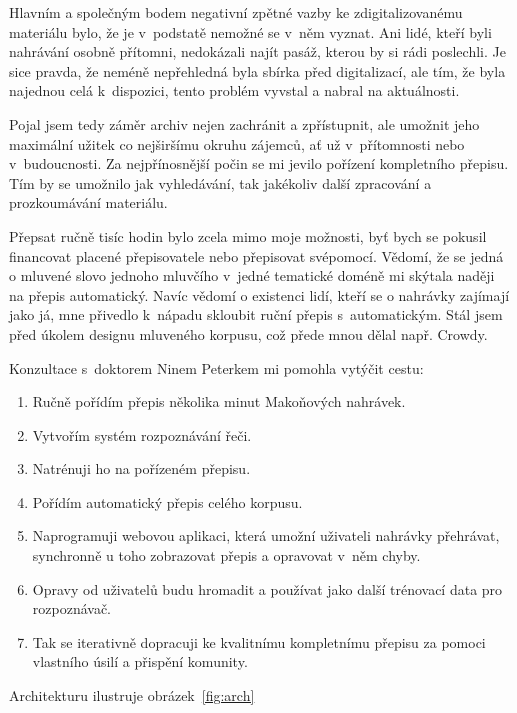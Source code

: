 Hlavním a společným bodem negativní zpětné vazby ke zdigitalizovanému materiálu
bylo, že je v~podstatě nemožné se v~něm vyznat. Ani lidé, kteří byli nahrávání
osobně přítomni, nedokázali najít pasáž, kterou by si rádi poslechli. Je
sice pravda, že neméně nepřehledná byla sbírka před digitalizací, ale tím, že
byla najednou celá k~dispozici, tento problém vyvstal a nabral na aktuálnosti.

Pojal jsem tedy záměr archiv nejen zachránit a zpřístupnit, ale umožnit jeho
maximální užitek co nejširšímu okruhu zájemců, ať už v~přítomnosti nebo
v~budoucnosti.
Za nejpřínosnější počin se mi jevilo pořízení kompletního
přepisu. Tím by se umožnilo jak vyhledávání, tak jakékoliv další zpracování a
prozkoumávání materiálu.

Přepsat ručně tisíc hodin bylo zcela mimo moje možnosti, byť bych se pokusil
financovat placené přepisovatele nebo
přepisovat svépomocí. Vědomí, že se jedná o mluvené slovo jednoho mluvčího
v~jedné tematické doméně mi skýtala naději na přepis automatický. Navíc vědomí o
existenci lidí, kteří se o nahrávky zajímají jako já, mne přivedlo
k~nápadu skloubit ruční přepis s~automatickým.
Stál jsem před úkolem designu mluveného korpusu, což přede mnou dělal
např. Crowdy\cite{crowdy1993spoken}.

Konzultace s~doktorem Ninem Peterkem mi pomohla vytýčit cestu:
\begin{enumerate}
\item{Ručně pořídím přepis několika minut Makoňových nahrávek.}
\item{Vytvořím systém rozpoznávání řeči.}
\item{Natrénuji ho na pořízeném přepisu.}
\item{Pořídím automatický přepis celého korpusu.}
\item{Naprogramuji webovou aplikaci, která umožní uživateli nahrávky přehrávat,
synchronně u toho zobrazovat přepis a opravovat v~něm chyby.}
\item{Opravy od uživatelů budu hromadit a používat jako další trénovací data pro
rozpoznávač.}
\item{Tak se iterativně dopracuji ke kvalitnímu kompletnímu přepisu za pomoci
vlastního úsilí a přispění komunity.}
\end{enumerate}

Architekturu ilustruje obrázek~\ref{fig:arch}

